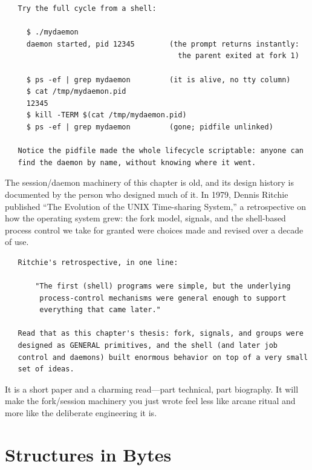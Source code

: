 \begin{verbatim}
   Try the full cycle from a shell:

     $ ./mydaemon
     daemon started, pid 12345        (the prompt returns instantly:
                                        the parent exited at fork 1)

     $ ps -ef | grep mydaemon         (it is alive, no tty column)
     $ cat /tmp/mydaemon.pid
     12345
     $ kill -TERM $(cat /tmp/mydaemon.pid)
     $ ps -ef | grep mydaemon         (gone; pidfile unlinked)

   Notice the pidfile made the whole lifecycle scriptable: anyone can
   find the daemon by name, without knowing where it went.
\end{verbatim}

\begin{researchnote}
The session/daemon machinery of this chapter is old, and its design
history is documented by the person who designed much of it. In 1979,
Dennis Ritchie published ``The Evolution of the UNIX Time-sharing
System,'' a retrospective on how the operating system grew: the fork
model, signals, and the shell-based process control we take for
granted were choices made and revised over a decade of use.

\begin{verbatim}
   Ritchie's retrospective, in one line:

       "The first (shell) programs were simple, but the underlying
        process-control mechanisms were general enough to support
        everything that came later."

   Read that as this chapter's thesis: fork, signals, and groups were
   designed as GENERAL primitives, and the shell (and later job
   control and daemons) built enormous behavior on top of a very small
   set of ideas.
\end{verbatim}

It is a short paper and a charming read---part technical, part
biography. It will make the fork/session machinery you just wrote feel
less like arcane ritual and more like the deliberate engineering it is.

\end{researchnote}

\section{Structures in Bytes}

